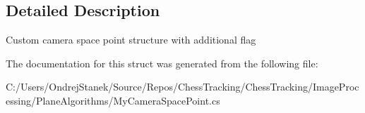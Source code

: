 \subsection{Detailed Description}
Custom camera space point structure with additional flag 



The documentation for this struct was generated from the following file\+:\begin{DoxyCompactItemize}
\item 
C\+:/\+Users/\+Ondrej\+Stanek/\+Source/\+Repos/\+Chess\+Tracking/\+Chess\+Tracking/\+Image\+Processing/\+Plane\+Algorithms/My\+Camera\+Space\+Point.\+cs\end{DoxyCompactItemize}
